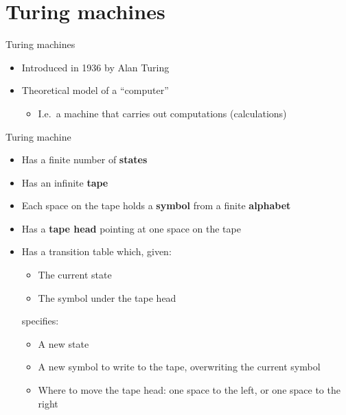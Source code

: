 \part{Turing machines}
\frame{\partpage}

\begin{frame}{Turing machines}
    \begin{itemize}
        \pause\item Introduced in 1936 by Alan Turing
        \pause\item Theoretical model of a ``computer''
            \begin{itemize}
                \pause\item I.e.\ a machine that carries out computations (calculations)
            \end{itemize}
    \end{itemize}
\end{frame}

\begin{frame}{Turing machine}
    \begin{itemize}
        \pause\item Has a finite number of \textbf{states}
        \pause\item Has an infinite \textbf{tape}
        \pause\item Each space on the tape holds a \textbf{symbol} from a finite \textbf{alphabet}
        \pause\item Has a \textbf{tape head} pointing at one space on the tape
        \pause\item Has a transition table which, given:
            \begin{itemize}
                \item The current state
                \item The symbol under the tape head
            \end{itemize}
        specifies:
            \begin{itemize}
                \item A new state
                \item A new symbol to write to the tape, overwriting the current symbol
                \item Where to move the tape head: one space to the left, or one space to the right
            \end{itemize}
    \end{itemize}
\end{frame}

